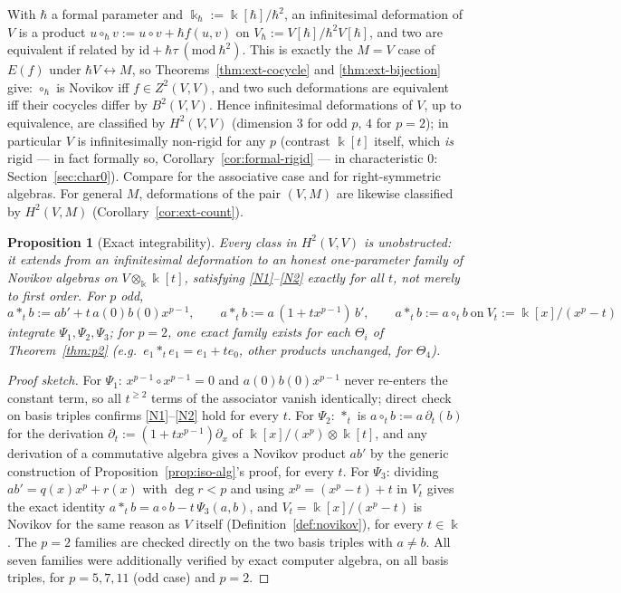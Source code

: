 \documentclass[11pt,reqno]{amsart}
\theoremstyle{plain}
\newtheorem{proposition}[theorem]{Proposition}
\theoremstyle{definition}
\newcommand{\kk}{\Bbbk}
\newcommand{\Zt}{Z^2}
\newcommand{\Bt}{B^2}
\newcommand{\Ht}{H^2}
\begin{document}
With $\hbar$ a formal parameter and $\kk_\hbar:=\kk[\hbar]/\hbar^2$, an infinitesimal
deformation of $V$ is a product $u\circ_\hbar v:=u\circ v+\hbar f(u,v)$ on
$V_\hbar:=V[\hbar]/\hbar^2V[\hbar]$, and two are equivalent if related by
$\mathrm{id}+\hbar\tau\ (\mathrm{mod}\ \hbar^2)$. This is exactly the $M=V$ case of
$E(f)$ under $\hbar V\leftrightarrow M$, so Theorems~\ref{thm:ext-cocycle} and
\ref{thm:ext-bijection} give: $\circ_\hbar$ is Novikov iff $f\in\Zt(V,V)$, and two such
deformations are equivalent iff their cocycles differ by $\Bt(V,V)$. Hence infinitesimal
deformations of $V$, up to equivalence, are classified by $\Ht(V,V)$ (dimension $3$ for odd
$p$, $4$ for $p=2$); in particular $V$ is infinitesimally non-rigid for any $p$ (contrast
$\kk[t]$ itself, which \emph{is} rigid --- in fact formally so, Corollary~\ref{cor:formal-rigid}
--- in characteristic $0$: Section~\ref{sec:char0}). Compare \cite{Gerstenhaber} for the
associative case and \cite[\S4]{Dzhu1999} for right-symmetric algebras. For general $M$,
deformations of the pair $(V,M)$ are likewise classified by $\Ht(V,M)$
(Corollary~\ref{cor:ext-count}).

\begin{proposition}[Exact integrability]\label{prop:exact-integrability}
Every class in $\Ht(V,V)$ is unobstructed: it extends from an infinitesimal deformation to
an honest one-parameter family of Novikov algebras on $V\otimes_\kk\kk[t]$, satisfying
\eqref{N1}--\eqref{N2} exactly for all $t$, not merely to first order. For $p$ odd,
\[
a *_t b:=ab'+t\,a(0)b(0)x^{p-1},\qquad a*_t b:=a\,(1+tx^{p-1})\,b',\qquad
a*_t b:=a\circ_t b\ \text{on}\ V_t:=\kk[x]/(x^p-t)
\]
integrate $\Psi_1,\Psi_2,\Psi_3$; for $p=2$, one exact family exists for each $\Theta_i$ of
Theorem~\ref{thm:p2} (e.g.\ $e_1*_te_1=e_1+te_0$, other products unchanged, for $\Theta_4$).
\end{proposition}

\begin{proof}[Proof sketch]
For $\Psi_1$: $x^{p-1}\circ x^{p-1}=0$ and $a(0)b(0)x^{p-1}$ never re-enters the constant
term, so all $t^{\ge2}$ terms of the associator vanish identically; direct check on basis
triples confirms \eqref{N1}--\eqref{N2} hold for every $t$.
For $\Psi_2$: $*_t$ is $a\circ_t b:=a\,\partial_t(b)$ for the derivation
$\partial_t:=(1+tx^{p-1})\partial_x$ of $\kk[x]/(x^p)\otimes\kk[t]$, and any derivation of a
commutative algebra gives a Novikov product $ab'$ by the generic construction of
Proposition~\ref{prop:iso-alg}'s proof, for every $t$.
For $\Psi_3$: dividing $ab'=q(x)x^p+r(x)$ with $\deg r<p$ and using $x^p=(x^p-t)+t$ in $V_t$
gives the exact identity $a*_tb=a\circ b-t\,\Psi_3(a,b)$, and $V_t=\kk[x]/(x^p-t)$ is
Novikov for the same reason as $V$ itself (Definition~\ref{def:novikov}), for every $t\in\kk$.
The $p=2$ families are checked directly on the two basis triples with $a\ne b$. All seven
families were additionally verified by exact computer algebra, on all basis triples, for
$p=5,7,11$ (odd case) and $p=2$.
\end{proof}
\end{document}
